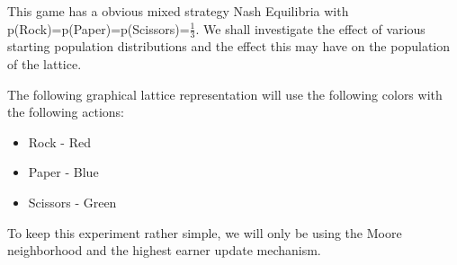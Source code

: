 \documentclass[a4paper, 11pt]{article}
\begin{document}
This game has a obvious mixed strategy Nash Equilibria with p(Rock)=p(Paper)=p(Scissors)=$\frac{1}{3}$. We shall investigate the effect of various starting population distributions and the effect this may have on the population of the lattice.

The following graphical lattice representation will use the following colors with the following actions:
\begin{itemize}[noitemsep]
  \item Rock - Red
  \item Paper - Blue
  \item Scissors - Green
\end{itemize}

To keep this experiment rather simple, we will only be using the Moore neighborhood and the highest earner update mechanism.
\end{document}
